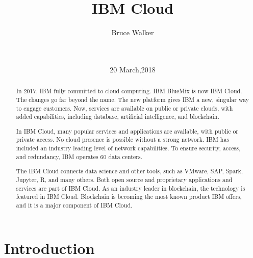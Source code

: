 \documentclass{acm_proc_article-sp}
\begin{document}
\title{IBM Cloud}

\author{
\alignauthor
Bruce Walker\\
       \\
       \\
} 
\date{20 March,2018}


\maketitle
\begin{abstract}

In 2017, IBM fully committed to cloud computing. IBM BlueMix
is now IBM Cloud. The changes go far beyond the name. The new 
platform gives IBM a new, singular way to engage customers. Now, services are available on public or 
private clouds, with added capabilities, including database, 
artificial intelligence, and blockchain.

In IBM Cloud, many popular services and applications are 
available, with public or private access. No cloud presence 
is possible without a strong network. IBM has included an 
industry leading level of network capabilities. To ensure 
security, access, and redundancy, IBM operates 60 data centers.

The IBM Cloud connects data science and other tools, such as 
VMware, SAP, Spark, Jupyter, R, and many others. Both open source and proprietary 
applications and services are part of IBM Cloud.
As an industry leader in blockchain, the 
technology is featured in IBM Cloud. Blockchain is becoming 
the most known product IBM offers, and it is a major component
of IBM Cloud. 
\end{abstract}




\section{Introduction}
\end{document}
